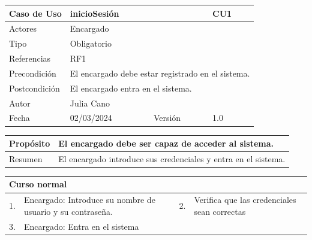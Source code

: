 \begin{table}[H]
	\centering
	\begin{tabular}{| m{} | m{} | m{} | m{} |}
		\hline
		\rowcolor{grayshade} Caso de Uso & \multicolumn{2}{|m{0.43\textwidth}|}{inicioSesión} &  CU1\\ 
		\hline
		Actores & \multicolumn{3}{l|}{Encargado} \\ 
		\hline
		Tipo & \multicolumn{3}{l|}{Obligatorio} \\ 
		\hline
		Referencias & \multicolumn{3}{l|}{RF1} \\ 
		\hline
		Precondición & \multicolumn{3}{l|}{El encargado debe estar registrado en el sistema.} \\ 
		\hline
		Postcondición & \multicolumn{3}{l|}{El encargado entra en el sistema.} \\ 
		\hline
		Autor & \multicolumn{3}{l|}{Julia Cano} \\ 
		\hline
		Fecha & 02/03/2024 & Versión & 1.0 \\
		\hline
	\end{tabular}
\end{table}

\begin{table}[H]
	\centering
	\begin{tabular}{| m{} | m{} | m{} | m{} |}
		\hline
		Propósito & \multicolumn{3}{m{0.67\textwidth}|}{El encargado debe ser capaz de acceder al sistema.}   \\ 
		\hline
		Resumen & \multicolumn{3}{m{0.67\textwidth}|}{El encargado introduce sus credenciales y entra en el sistema.} \\ 
		\hline
	\end{tabular}
\end{table}

\begin{table}[H]
	\centering
	\begin{tabular}{| m{} | m{} | m{} | m{} |}
		\hline
		\multicolumn{4}{|m{0.9\textwidth}|}{Curso normal}     \\ 
		\hline
		1. & Encargado: Introduce su nombre de usuario y su contraseña. & 2. &  Verifica que las credenciales sean correctas \\ 
		\hline
		3. & Encargado: Entra en el sistema & &  \\ 
		\hline
	\end{tabular}
\end{table}

